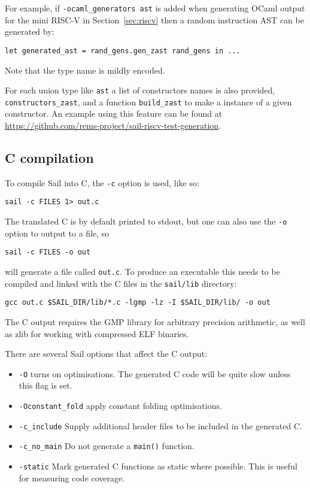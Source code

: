 For example, if \verb+-ocaml_generators ast+ is added when generating
OCaml output for the mini RISC-V in Section~\ref{sec:riscv} then a
random instruction AST can be generated by:
\begin{lstlisting}
let generated_ast = rand_gens.gen_zast rand_gens in ...
\end{lstlisting}
Note that the type name is mildly encoded.

For each union type like \verb+ast+ a list of constructors names is
also provided, \verb+constructors_zast+, and a function
\verb+build_zast+ to make a instance of a given constructor.  An
example using this feature can be found at
\url{https://github.com/rems-project/sail-riscv-test-generation}.

\subsection{C compilation}

To compile Sail into C, the \verb+-c+ option is used, like so:
\begin{verbatim}
sail -c FILES 1> out.c
\end{verbatim}
The translated C is by default printed to stdout, but one can also use
the \verb+-o+ option to output to a file, so
\begin{verbatim}
sail -c FILES -o out
\end{verbatim}
will generate a file called \verb+out.c+. To produce an executable
this needs to be compiled and linked with the C files in the
\verb+sail/lib+ directory:
\begin{verbatim}
gcc out.c $SAIL_DIR/lib/*.c -lgmp -lz -I $SAIL_DIR/lib/ -o out
\end{verbatim}
The C output requires the GMP library for arbitrary precision
arithmetic, as well as zlib for working with compressed ELF binaries.

There are several Sail options that affect the C output:
\begin{itemize}
  \item \verb+-O+ turns on optimisations. The generated C code will be
    quite slow unless this flag is set.
  \item \verb+-Oconstant_fold+ apply constant folding optimisations.
  \item \verb+-c_include+ Supply additional header files to be
    included in the generated C.
  \item \verb+-c_no_main+ Do not generate a \verb+main()+ function.
  \item \verb+-static+ Mark generated C functions as static where
    possible. This is useful for measuring code coverage.
\end{itemize}

